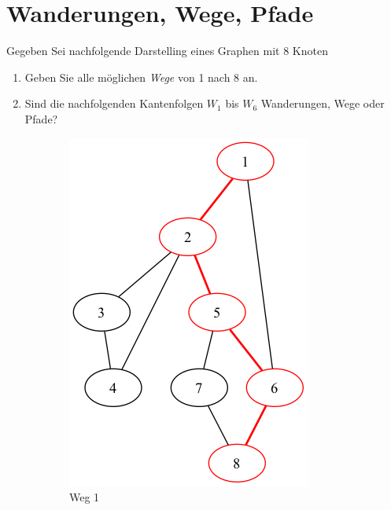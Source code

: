 \documentclass[a4paper,11pt]{report}
\begin{document}
\chapter{Wanderungen, Wege, Pfade}
Gegeben Sei nachfolgende Darstelling eines Graphen mit 8 Knoten

\begin{enumerate}
    \item Geben Sie alle möglichen \textit{Wege} von 1 nach 8 an.
    \item Sind die nachfolgenden Kantenfolgen $W_1$ bis $W_6$ Wanderungen, Wege oder Pfade?
\end{enumerate}

\begin{figure}[htbp]
    \centering
    \begin{subfigure}[b]{0.45\textwidth}
        \includegraphics[height=0.2\textheight]{notebook/assets/aufgabe_03_graph_path_1_to_8_1.png}
        \caption{Weg 1}
        \label{fig:way_1}
    \end{subfigure}
    \hfill
    \begin{subfigure}[b]{0.45\textwidth}

\end{subfigure}
\end{figure}
\end{document}
